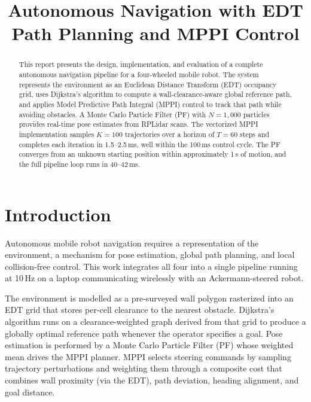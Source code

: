 \documentclass[conference]{IEEEtran}
\begin{document}
\title{Autonomous Navigation with EDT Path Planning and MPPI Control}

\author{
}

\maketitle

\begin{abstract}
This report presents the design, implementation, and evaluation of a complete autonomous navigation pipeline for a four-wheeled mobile robot. The system represents the environment as an Euclidean Distance Transform (EDT) occupancy grid, uses Dijkstra's algorithm to compute a wall-clearance-aware global reference path, and applies Model Predictive Path Integral (MPPI) control to track that path while avoiding obstacles. A Monte Carlo Particle Filter (PF) with $N{=}1{,}000$ particles provides real-time pose estimates from RPLidar scans. The vectorized MPPI implementation samples $K{=}100$ trajectories over a horizon of $T{=}60$ steps and completes each iteration in 1.5--2.5\,ms, well within the 100\,ms control cycle. The PF converges from an unknown starting position within approximately 1\,s of motion, and the full pipeline loop runs in 40--42\,ms.
\end{abstract}

\section{Introduction}
Autonomous mobile robot navigation requires a representation of the environment, a mechanism for pose estimation, global path planning, and local collision-free control. This work integrates all four into a single pipeline running at 10\,Hz on a laptop communicating wirelessly with an Ackermann-steered robot.

The environment is modelled as a pre-surveyed wall polygon rasterized into an EDT grid that stores per-cell clearance to the nearest obstacle. Dijkstra's algorithm runs on a clearance-weighted graph derived from that grid to produce a globally optimal reference path whenever the operator specifies a goal. Pose estimation is performed by a Monte Carlo Particle Filter (PF) whose weighted mean drives the MPPI planner. MPPI selects steering commands by sampling trajectory perturbations and weighting them through a composite cost that combines wall proximity (via the EDT), path deviation, heading alignment, and goal distance.
\end{document}
